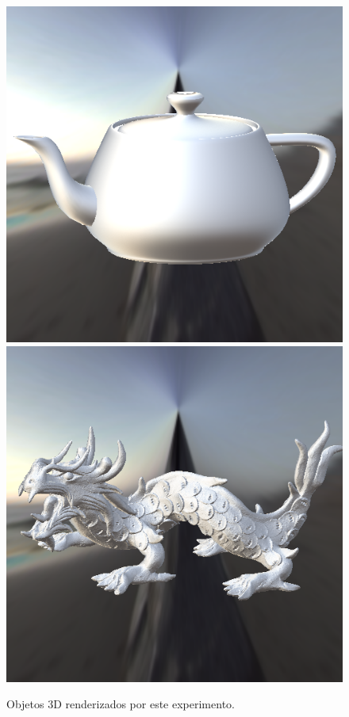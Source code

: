 \begin{figure}[H]
    \caption{\small{Objetos 3D renderizados por este experimento.}}\label{fig-edwards-2006-eqlang}
  \includegraphics[width=\linewidth]{./Imagens/brdfs/edwards-2006-teapot.png}
\endminipage\hfill
{}
  \includegraphics[width=\linewidth]{./Imagens/brdfs/edwards-2006-dragon.png}

\end{figure}
